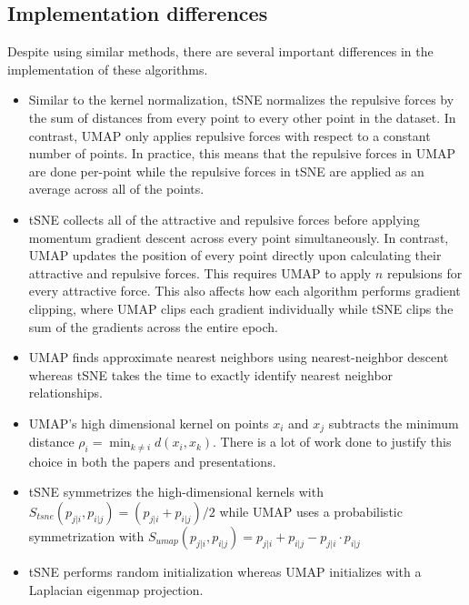 \documentclass{article}
\theoremstyle{definition}
\begin{document}
\begin{multicols}{2}
\subsection{Implementation differences}
Despite using similar methods, there are several important differences in the implementation of these algorithms.

\begin{itemize}
    \item Similar to the kernel normalization, tSNE normalizes the repulsive forces by the sum of distances from every point to every other point in the
        dataset. In contrast, UMAP only applies repulsive forces with respect to a constant number of points. In practice, this means that the repulsive forces in UMAP are done per-point while the repulsive forces in tSNE are applied as an average across all of the points.

    \item tSNE collects all of the attractive and repulsive forces before applying momentum gradient descent across every point simultaneously. In contrast,
        UMAP updates the position of every point directly upon calculating their attractive and repulsive forces. This requires UMAP to apply $n$ repulsions for
        every attractive force. This also affects how each algorithm performs gradient clipping, where UMAP clips each gradient individually while tSNE clips
        the sum of the gradients across the entire epoch.

    \item UMAP finds approximate nearest neighbors using nearest-neighbor descent whereas tSNE takes the time to exactly identify nearest neighbor relationships.

    \item UMAP's high dimensional kernel on points $x_i$ and $x_j$ subtracts the minimum distance $\rho_i = \min_{k \neq i} d(x_i, x_k)$. There is a lot of
        work done to justify this choice in both the papers and presentations. 

    \item tSNE symmetrizes the high-dimensional kernels with $S_{tsne}(p_{j|i}, p_{i|j}) = (p_{j|i} + p_{i|j}) / 2$ while UMAP uses a probabilistic
        symmetrization with $S_{umap}(p_{j|i}, p_{i|j}) = p_{j|i} + p_{i|j} - p_{j|i} \cdot p_{i|j}$

    \item tSNE performs random initialization whereas UMAP initializes with a Laplacian eigenmap projection.


\end{itemize}
\end{multicols}
\end{document}
